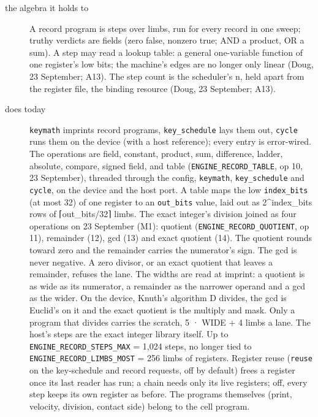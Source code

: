 \begin{description}
\item[{the algebra it holds to}] A record program is steps over limbs, run for every record in one sweep; truthy verdicts are fields (zero false, nonzero true; AND a product, OR a sum). A step may read a lookup table: a general one-variable function of one register's low bits; the machine's edges are no longer only linear (Doug, 23 September; A13). The step count is the scheduler's n, held apart from the register file, the binding resource (Doug, 23 September; A13).
\item[{does today}] \texttt{keymath} imprints record programs, \texttt{key\_\allowbreak{}schedule} lays them out, \texttt{cycle} runs them on the device (with a host reference); every entry is error-wired. The operations are field, constant, product, sum, difference, ladder, absolute, compare, signed field, and table (\texttt{ENGINE\_\allowbreak{}RECORD\_\allowbreak{}TABLE}, op 10, 23 September), threaded through the config, \texttt{keymath}, \texttt{key\_\allowbreak{}schedule} and \texttt{cycle}, on the device and the host port. A table maps the low \texttt{index\_\allowbreak{}bits} (at most 32) of one register to an \texttt{out\_\allowbreak{}bits} value, laid out as 2\textasciicircum{}index\_\allowbreak{}bits rows of ⌈out\_\allowbreak{}bits/32⌉ limbs. The exact integer's division joined as four operations on 23 September (M1): quotient (\texttt{ENGINE\_\allowbreak{}RECORD\_\allowbreak{}QUOTIENT}, op 11), remainder (12), gcd (13) and exact quotient (14). The quotient rounds toward zero and the remainder carries the numerator's sign. The gcd is never negative. A zero divisor, or an exact quotient that leaves a remainder, refuses the lane. The widths are read at imprint: a quotient is as wide as its numerator, a remainder as the narrower operand and a gcd as the wider. On the device, Knuth's algorithm D divides, the gcd is Euclid's on it and the exact quotient is the multiply and mask. Only a program that divides carries the scratch, 5 · WIDE + 4 limbs a lane. The host's steps are the exact integer library itself. Up to \texttt{ENGINE\_\allowbreak{}RECORD\_\allowbreak{}STEPS\_\allowbreak{}MAX} = 1,024 steps, no longer tied to \texttt{ENGINE\_\allowbreak{}RECORD\_\allowbreak{}LIMBS\_\allowbreak{}MOST} = 256 limbs of registers. Register reuse (\texttt{reuse} on the key-schedule and record requests, off by default) frees a register once its last reader has run; a chain needs only its live registers; off, every step keeps its own register as before. The programs themselves (print, velocity, division, contact side) belong to the cell program.

\end{description}
